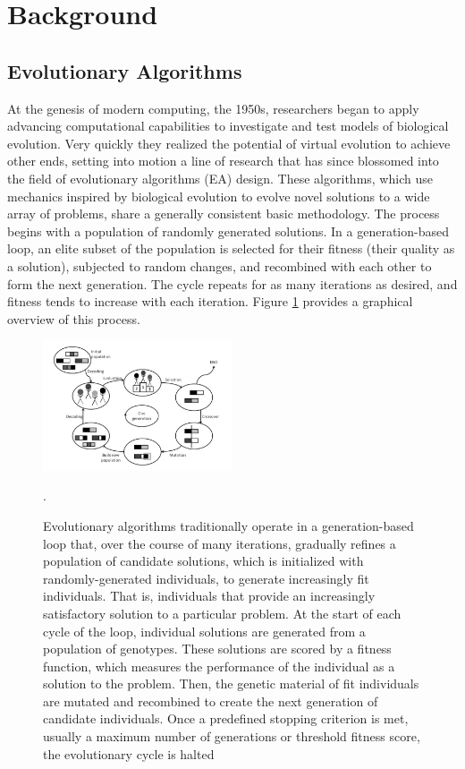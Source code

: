 \section{Background} \label{sec:background}
\subsection{Evolutionary Algorithms}
At the genesis of modern computing, the 1950s, researchers began to apply advancing computational capabilities to investigate and test models of biological evolution. Very quickly they realized the potential of virtual evolution to achieve other ends, setting into motion a line of research that has since blossomed into the field of evolutionary algorithms (EA) design. These algorithms, which use mechanics inspired by biological evolution to evolve novel solutions to a wide array of problems, share a generally consistent basic methodology. The process begins with a population of randomly generated solutions. In a generation-based loop, an elite subset of the population is selected for their fitness (their quality as a solution), subjected to random changes, and recombined with each other to form the next generation. The cycle repeats for as many iterations as desired, and fitness tends to increase with each iteration. Figure \ref{fig:working_principle} provides a graphical overview of this process.
\begin{figure}
\centering
\includegraphics[width=0.5\textwidth]{img/working_principle_of_EA.jpg}
\caption{\label{fig:working_principle} Evolutionary algorithms traditionally operate in a generation-based loop that, over the course of many iterations, gradually refines a population of candidate solutions, which is initialized with randomly-generated individuals, to generate increasingly fit individuals. That is, individuals that provide an increasingly satisfactory solution to a particular problem. At the start of each cycle of the loop, individual solutions are generated from a population of genotypes. These solutions are scored by a fitness function, which measures the performance of the individual as a solution to the problem. Then, the genetic material of fit individuals are mutated and recombined to create the next generation of candidate individuals. Once a predefined stopping criterion is met, usually a maximum number of generations or threshold fitness score, the evolutionary cycle is halted \cite{Prothmann2009EvolutionaryOptimisation}}.
\end{figure}


